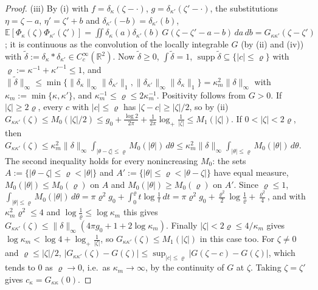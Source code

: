 \documentclass[11pt,a4paper]{article}
\theoremstyle{plain}
\theoremstyle{definition}
\theoremstyle{plain}
\theoremstyle{definition}
\newcommand{\R}{\mathbb{R}}
\newcommand{\E}{\mathbb{E}}
\DeclareMathOperator{\supp}{supp}
\begin{document}
\begin{proof}
(iii) By (i) with $f=\delta_\kappa(\zeta-\cdot)$, $g=\delta_{\kappa'}(\zeta'-\cdot)$, the
substitutions $\eta=\zeta-a$, $\eta'=\zeta'+b$ and $\delta_{\kappa'}(-b)=\delta_{\kappa'}(b)$,
$\E[\Phi_\kappa(\zeta)\Phi_{\kappa'}(\zeta')]=\iint\delta_\kappa(a)\delta_{\kappa'}(b)\,
G(\zeta-\zeta'-a-b)\,da\,db=G_{\kappa\kappa'}(\zeta-\zeta')$; it is continuous as the
convolution of the locally integrable $G$ (by (ii) and (iv)) with
$\tilde\delta:=\delta_\kappa*\delta_{\kappa'}\in C_c^\infty(\R^2)$. Now $\tilde\delta\ge0$,
$\int\tilde\delta=1$, $\supp\tilde\delta\subseteq\{|c|\le\varrho\}$ with
$\varrho:=\kappa^{-1}+\kappa'^{-1}\le1$, and
$\|\tilde\delta\|_\infty\le\min\{\|\delta_\kappa\|_\infty\|\delta_{\kappa'}\|_1,
\|\delta_{\kappa'}\|_\infty\|\delta_\kappa\|_1\}=\kappa_m^2\|\delta\|_\infty$ with
$\kappa_m:=\min\{\kappa,\kappa'\}$, and $\kappa_m^{-1}\le\varrho\le2\kappa_m^{-1}$.
Positivity follows from $G>0$. If $|\zeta|\ge2\varrho$, every $c$ with $|c|\le\varrho$ has
$|\zeta-c|\ge|\zeta|/2$, so by (ii)
$G_{\kappa\kappa'}(\zeta)\le M_0(|\zeta|/2)\le g_0+\frac{\log2}{2\pi}
+\frac1{2\pi}\log_+\frac1{|\zeta|}\le M_1(|\zeta|)$. If $0<|\zeta|<2\varrho$, then
$G_{\kappa\kappa'}(\zeta)\le\kappa_m^2\|\delta\|_\infty\int_{|\theta-\zeta|\le\varrho}
M_0(|\theta|)\,d\theta\le\kappa_m^2\|\delta\|_\infty\int_{|\theta|\le\varrho}M_0(|\theta|)\,d\theta$.
The second inequality holds for every nonincreasing $M_0$: the sets
$A:=\{|\theta-\zeta|\le\varrho<|\theta|\}$ and $A':=\{|\theta|\le\varrho<|\theta-\zeta|\}$ have
equal measure, $M_0(|\theta|)\le M_0(\varrho)$ on $A$ and $M_0(|\theta|)\ge M_0(\varrho)$ on
$A'$. Since $\varrho\le1$,
$\int_{|\theta|\le\varrho}M_0(|\theta|)\,d\theta=\pi\varrho^2g_0+\int_0^\varrho
t\log\frac1t\,dt=\pi\varrho^2g_0+\frac{\varrho^2}2\log\frac1\varrho+\frac{\varrho^2}4$, and with
$\kappa_m^2\varrho^2\le4$ and $\log\frac1\varrho\le\log\kappa_m$ this gives
$G_{\kappa\kappa'}(\zeta)\le\|\delta\|_\infty(4\pi g_0+1+2\log\kappa_m)$. Finally
$|\zeta|<2\varrho\le4/\kappa_m$ gives $\log\kappa_m<\log4+\log_+\frac1{|\zeta|}$, so
$G_{\kappa\kappa'}(\zeta)\le M_1(|\zeta|)$ in this case too. For $\zeta\ne0$ and
$\varrho\le|\zeta|/2$,
$|G_{\kappa\kappa'}(\zeta)-G(\zeta)|\le\sup_{|c|\le\varrho}|G(\zeta-c)-G(\zeta)|$, which tends
to $0$ as $\varrho\to0$, i.e.\ as $\kappa_m\to\infty$, by the continuity of $G$ at $\zeta$.
Taking $\zeta=\zeta'$ gives $c_\kappa=G_{\kappa\kappa}(0)$.
\end{proof}
\end{document}
